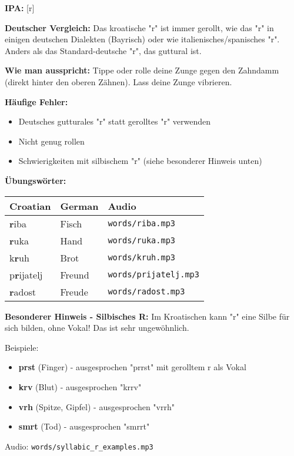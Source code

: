 \begin{tcolorbox}[colback=lightyellow!30, colframe=orange, title=\textbf{R, r}]

\textbf{IPA:} [r]

\textbf{Deutscher Vergleich:}
Das kroatische "r" ist immer gerollt, wie das "r" in einigen deutschen Dialekten (Bayrisch) oder wie italienisches/spanisches "r". Anders als das Standard-deutsche "r", das guttural ist.

\textbf{Wie man ausspricht:}
Tippe oder rolle deine Zunge gegen den Zahndamm (direkt hinter den oberen Zähnen). Lass deine Zunge vibrieren.

\textbf{Häufige Fehler:}
\begin{itemize}
    \item Deutsches gutturales "r" statt gerolltes "r" verwenden
    \item Nicht genug rollen
    \item Schwierigkeiten mit silbischem "r" (siehe besonderer Hinweis unten)
\end{itemize}

\textbf{Übungswörter:}
\begin{tabular}{lll}
\textbf{Croatian} & \textbf{German} & \textbf{Audio} \\
\midrule
\textbf{r}iba & Fisch & \texttt{words/riba.mp3} \\
\textbf{r}uka & Hand & \texttt{words/ruka.mp3} \\
k\textbf{r}uh & Brot & \texttt{words/kruh.mp3} \\
p\textbf{r}ijatelj & Freund & \texttt{words/prijatelj.mp3} \\
\textbf{r}adost & Freude & \texttt{words/radost.mp3} \\
\end{tabular}

\textbf{Besonderer Hinweis - Silbisches R:}
Im Kroatischen kann "r" eine Silbe für sich bilden, ohne Vokal! Das ist sehr ungewöhnlich.

Beispiele:
\begin{itemize}
    \item \textbf{prst} (Finger) - ausgesprochen "prrst" mit gerolltem r als Vokal
    \item \textbf{krv} (Blut) - ausgesprochen "krrv"
    \item \textbf{vrh} (Spitze, Gipfel) - ausgesprochen "vrrh"
    \item \textbf{smrt} (Tod) - ausgesprochen "smrrt"
\end{itemize}

Audio: \texttt{words/syllabic\_r\_examples.mp3}

\end{tcolorbox}


